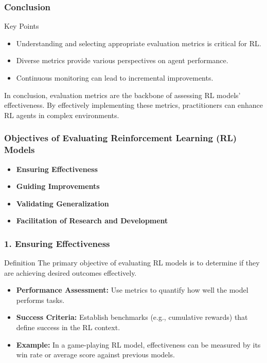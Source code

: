 \documentclass{beamer}
\begin{document}
\begin{frame}[fragile]
    \frametitle{Conclusion}
    \begin{block}{Key Points}
        \begin{itemize}
            \item Understanding and selecting appropriate evaluation metrics is critical for RL.
            \item Diverse metrics provide various perspectives on agent performance.
            \item Continuous monitoring can lead to incremental improvements.
        \end{itemize}
    \end{block}
    In conclusion, evaluation metrics are the backbone of assessing RL models' effectiveness. By effectively implementing these metrics, practitioners can enhance RL agents in complex environments.
\end{frame}

\begin{frame}[fragile]
    \frametitle{Objectives of Evaluating Reinforcement Learning (RL) Models}
    \begin{itemize}
        \item \textbf{Ensuring Effectiveness}
        \item \textbf{Guiding Improvements}
        \item \textbf{Validating Generalization}
        \item \textbf{Facilitation of Research and Development}
    \end{itemize}
\end{frame}

\begin{frame}[fragile]
    \frametitle{1. Ensuring Effectiveness}
    \begin{block}{Definition}
        The primary objective of evaluating RL models is to determine if they are achieving desired outcomes effectively.
    \end{block}
    \begin{itemize}
        \item \textbf{Performance Assessment:} Use metrics to quantify how well the model performs tasks.
        \item \textbf{Success Criteria:} Establish benchmarks (e.g., cumulative rewards) that define success in the RL context.
        \item \textbf{Example:} In a game-playing RL model, effectiveness can be measured by its win rate or average score against previous models.
    \end{itemize}
\end{frame}
\end{document}
